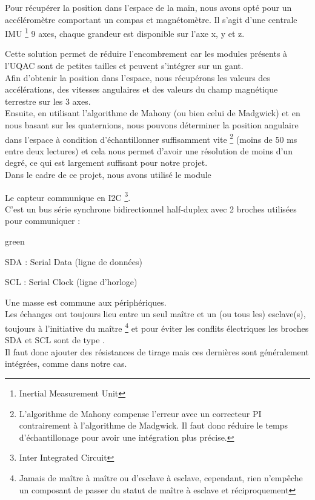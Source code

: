 Pour récupérer la position dans l’espace de la main, nous avons opté pour un accéléromètre comportant un compas et magnétomètre. Il s'agit d'une centrale IMU \footnote{Inertial Measurement Unit} 9 axes, chaque grandeur est disponible sur l'axe x, y et z.\\

 
Cette solution permet de réduire l'encombrement car les modules présents à l'UQAC sont de petites tailles et peuvent s'intégrer sur un gant.\\

Afin d'obtenir la position dans l'espace, nous récupérons les valeurs des accélérations, des vitesses angulaires et des valeurs du champ magnétique terrestre sur les 3 axes. \\
Ensuite, en utilisant l’algorithme de Mahony (ou bien celui de Madgwick) et en nous basant sur les quaternions, nous pouvons déterminer la position angulaire dans l'espace à condition d'échantillonner suffisamment vite \footnote{L'algorithme de Mahony compense l'erreur avec un correcteur PI contrairement à l'algorithme de Madgwick. Il faut donc réduire le temps d'échantillonage pour avoir une intégration plus précise.} (moins de 50 ms entre deux lectures) et cela nous permet d'avoir une résolution de moins d’un degré, ce qui est largement suffisant pour notre projet.\\

Dans le cadre de ce projet, nous avons utilisé le module 

 
 Le capteur communique en I2C \footnote{Inter Integrated Circuit}.\\
C'est un bus série synchrone bidirectionnel half-duplex avec 2 broches utilisées pour communiquer :
\begin{items}{green}{\Triangle}
    \item SDA : Serial Data (ligne de données) 
    \item SCL : Serial Clock (ligne d'horloge) 
\end{items}

Une masse est commune aux périphériques.\\

Les échanges ont toujours lieu entre un seul maître et un (ou tous les) esclave(s), toujours à l’initiative du maître \footnote{Jamais de maître à maître ou d’esclave à esclave, cependant, rien n’empêche un composant de passer du statut de maître à esclave et réciproquement} et pour éviter les conflits électriques les broches SDA et SCL sont de type .\\ 
Il faut donc ajouter des résistances de tirage mais ces dernières sont généralement intégrées, comme dans notre cas.

